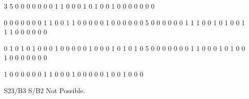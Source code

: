 \begin{datain}
3
5
0 0 0 0 0
0 0 1 1 0
0 0 1 0 1
0 0 1 0 0
0 0 0 0 0

0 0 0 0 0
0 0 1 1 0
0 1 1 0 0
0 0 0 1 0
0 0 0 0 0
5
0 0 0 0 0
0 1 1 1 0
0 1 0 1 0
0 1 1 1 0
0 0 0 0 0

0 1 0 1 0
1 0 0 0 1
0 0 0 0 0
1 0 0 0 1
0 1 0 1 0
5
0 0 0 0 0
0 0 1 1 0
0 0 1 0 1
0 0 1 0 0
0 0 0 0 0

1 0 0 0 0
0 0 1 1 0
0 0 1 0 0
0 0 0 1 0
0 1 0 0 0
\end{datain}

\begin{dataout}
S23/B3
S/B2
Not Possible.
\end{dataout}


